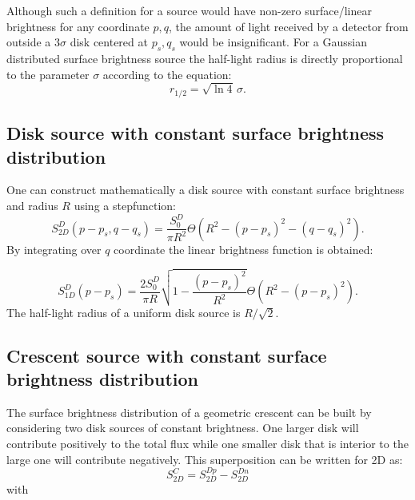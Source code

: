 \documentclass[usenatbib]{mn2e}
\begin{document}
Although such a definition for a source would have non-zero surface/linear brightness for any coordinate $p,q$, the amount of light received by a detector from outside a $3 \sigma$ disk centered at $p_s, q_s$ 
would be insignificant. For a Gaussian distributed surface brightness source the half-light radius is directly proportional to the parameter $\sigma$ according to the equation:
\begin{equation}
r_{1/2} = \sqrt{\ln4}\,\sigma.
\end{equation}

\subsection{Disk source with constant surface brightness distribution}

One can construct mathematically a disk source with constant surface brightness and radius $R$ using a stepfunction:
\begin{equation}
 S_{2D}^D(p-p_s, q-q_s) = \frac{S_0^D}{\pi R^2} \Theta \left( R^2 - \left( p-p_s \right)^2 - \left( q-q_s \right)^2 \right).
\end{equation}
By integrating over $q$ coordinate the linear brightness function is obtained:


\begin{equation}
 S_{1D}^D(p-p_s) = \frac{2 S_0^D}{\pi R}  \sqrt{1 - \frac{(p-p_s)^2}{R^2} }    \Theta \left( R^2 - \left( p-p_s \right)^2 \right).
\end{equation}
The half-light radius of a uniform disk source is $R/\sqrt{2}$.

\subsection{Crescent source with constant surface brightness distribution}\label{subsec:crescent}

The surface brightness distribution of a geometric crescent can be built 
by considering two disk sources of constant brightness. One larger disk 
will contribute positively to the total flux while one smaller disk 
that is interior to the large one will contribute negatively. This superposition can be written for 2D as:\\

\begin{equation}
 S_{2D}^C =  S_{2D}^{Dp} -  S_{2D}^{Dn}  
 \label{eqn:s2d}
\end{equation}
with\\
\end{document}
